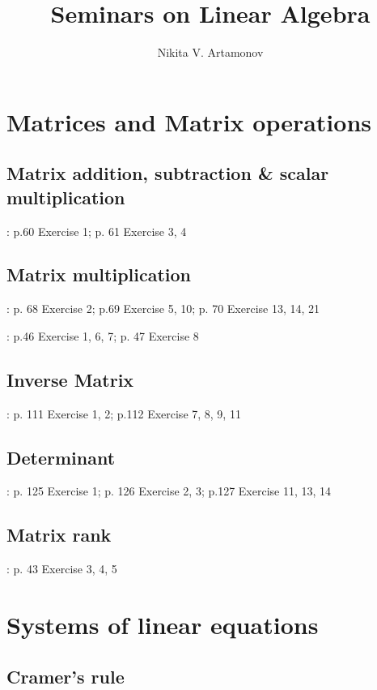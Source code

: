 \documentclass[12pt]{article}
\title{Seminars on Linear Algebra}
\author{Nikita V. Artamonov}
\begin{document}
\maketitle

\section{Matrices and Matrix operations}

\subsection{Matrix addition, subtraction \& scalar multiplication}
\cite{Shores}: p.60 Exercise 1; p. 61 Exercise 3, 4

\subsection{Matrix multiplication}

\cite{Shores}: p. 68 Exercise 2; p.69 Exercise 5, 10;
p. 70 Exercise 13, 14, 21

\noindent\cite{Robbiano}: p.46 Exercise 1, 6, 7; p. 47 Exercise 8

\subsection{Inverse Matrix}

\cite{Shores}: p. 111 Exercise 1, 2;  p.112 Exercise 7, 8, 9, 11

\subsection{Determinant}

\cite{Shores}: p. 125 Exercise 1;  p. 126 Exercise 2, 3;  p.127 Exercise 11, 13, 14

\subsection{Matrix rank}

\cite{Shores}: p. 43 Exercise 3, 4, 5

\section{Systems of linear equations}

\subsection{Cramer's rule}
\end{document}

